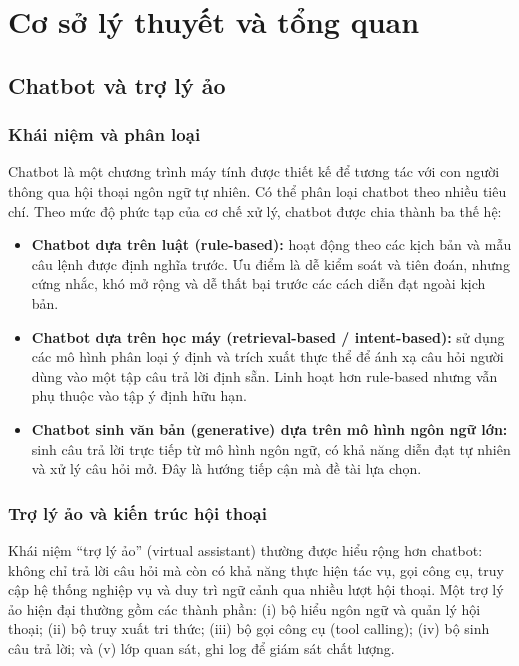 \chapter{Cơ sở lý thuyết và tổng quan}
\label{ch:coso}

\section{Chatbot và trợ lý ảo}
\label{sec:chatbot}

\subsection{Khái niệm và phân loại}

Chatbot là một chương trình máy tính được thiết kế để tương tác với con người thông qua
hội thoại ngôn ngữ tự nhiên. Có thể phân loại chatbot theo nhiều tiêu chí. Theo mức độ
phức tạp của cơ chế xử lý, chatbot được chia thành ba thế hệ:

\begin{itemize}
  \item \textbf{Chatbot dựa trên luật (rule-based):} hoạt động theo các kịch bản và mẫu
  câu lệnh được định nghĩa trước. Ưu điểm là dễ kiểm soát và tiên đoán, nhưng cứng nhắc,
  khó mở rộng và dễ thất bại trước các cách diễn đạt ngoài kịch bản.
  \item \textbf{Chatbot dựa trên học máy (retrieval-based / intent-based):} sử dụng các
  mô hình phân loại ý định và trích xuất thực thể để ánh xạ câu hỏi người dùng vào một tập
  câu trả lời định sẵn. Linh hoạt hơn rule-based nhưng vẫn phụ thuộc vào tập ý định hữu hạn.
  \item \textbf{Chatbot sinh văn bản (generative) dựa trên mô hình ngôn ngữ lớn:} sinh câu
  trả lời trực tiếp từ mô hình ngôn ngữ, có khả năng diễn đạt tự nhiên và xử lý câu hỏi mở.
  Đây là hướng tiếp cận mà đề tài lựa chọn.
\end{itemize}

\subsection{Trợ lý ảo và kiến trúc hội thoại}

Khái niệm ``trợ lý ảo'' (virtual assistant) thường được hiểu rộng hơn chatbot: không chỉ
trả lời câu hỏi mà còn có khả năng thực hiện tác vụ, gọi công cụ, truy cập hệ thống nghiệp
vụ và duy trì ngữ cảnh qua nhiều lượt hội thoại. Một trợ lý ảo hiện đại thường gồm các
thành phần: (i) bộ hiểu ngôn ngữ và quản lý hội thoại; (ii) bộ truy xuất tri thức; (iii)
bộ gọi công cụ (tool calling); (iv) bộ sinh câu trả lời; và (v) lớp quan sát, ghi log để
giám sát chất lượng.

